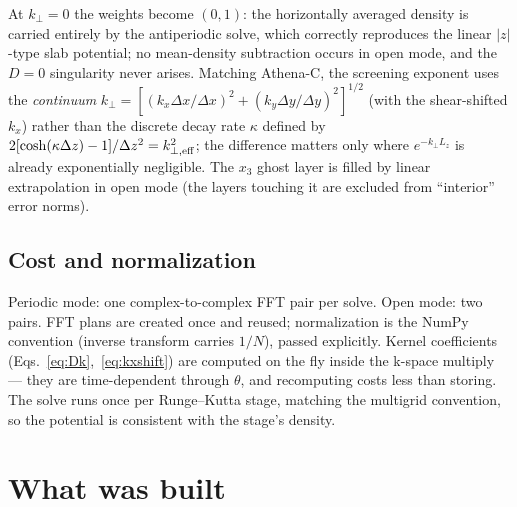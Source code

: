 \documentclass[11pt]{article}
\newcommand{\kperp}{k_\perp}
\begin{document}
At $\kperp=0$ the weights become $(0,1)$: the horizontally averaged density is
carried entirely by the antiperiodic solve, which correctly reproduces the linear
$|z|$-type slab potential; no mean-density subtraction occurs in open mode, and the
$D=0$ singularity never arises. Matching Athena-C, the screening exponent uses the
\emph{continuum} $\kperp = [(k_x\Delta x/\Delta x)^2+(k_y\Delta y/\Delta y)^2]^{1/2}$
(with the shear-shifted $k_x$) rather than the discrete decay rate $\kappa$ defined
by $2[\cosh(\kappa\Delta z)-1]/\Delta z^2 = k_{\perp,\rm eff}^2$; the difference
matters only where $e^{-\kperp L_z}$ is already exponentially negligible. The $x_3$
ghost layer is filled by linear extrapolation in open mode (the layers touching it
are excluded from ``interior'' error norms).

\subsection{Cost and normalization}
Periodic mode: one complex-to-complex FFT pair per solve. Open mode: two pairs.
FFT plans are created once and reused; normalization is the NumPy convention
(inverse transform carries $1/N$), passed explicitly. Kernel coefficients
(Eqs.~\ref{eq:Dk},~\ref{eq:kxshift}) are computed on the fly inside the k-space
multiply --- they are time-dependent through $\theta$, and recomputing costs less
than storing. The solve runs once per Runge--Kutta stage, matching the multigrid
convention, so the potential is consistent with the stage's density.

\section{What was built}
\label{sec:impl}
\end{document}
